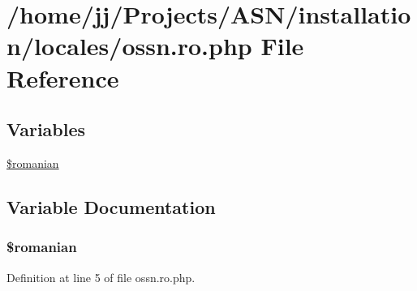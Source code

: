 \hypertarget{installation_2locales_2ossn_8ro_8php}{}\section{/home/jj/\+Projects/\+A\+S\+N/installation/locales/ossn.ro.\+php File Reference}
\label{installation_2locales_2ossn_8ro_8php}
\subsection*{Variables}
\begin{DoxyCompactItemize}
\item 
\hyperlink{installation_2locales_2ossn_8ro_8php_a56c7d7557393a6a7b559cf8ac914a2e4}{\$romanian}
\end{DoxyCompactItemize}


\subsection{Variable Documentation}
\subsubsection[{\texorpdfstring{\$romanian}{$romanian}}]{\setlength{\rightskip}{0pt plus 5cm}\$romanian}\hypertarget{installation_2locales_2ossn_8ro_8php_a56c7d7557393a6a7b559cf8ac914a2e4}{}\label{installation_2locales_2ossn_8ro_8php_a56c7d7557393a6a7b559cf8ac914a2e4}


Definition at line 5 of file ossn.\+ro.\+php.

